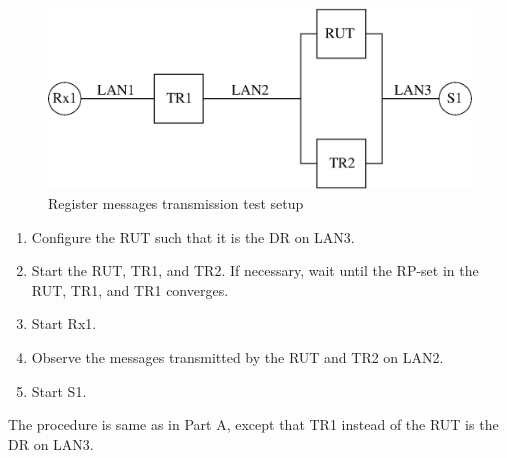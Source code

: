 \documentclass[11pt]{report}
\begin{document}
\begin{figure}[htbp]
  \begin{center}
    \includegraphics[scale=0.8]{figs/pim_test_3_1_register_messages_transmission}
    \caption{Register messages transmission test setup}
    \label{fig:pim_test_3_1_register_messages_transmission}
  \end{center}
\end{figure}



\begin{enumerate}

  \item Configure the RUT such that it is the DR on LAN3.

  \item Start the RUT, TR1, and TR2. If necessary, wait until the RP-set in
        the RUT, TR1, and TR1 converges.

  \item Start Rx1.

  \item Observe the messages transmitted by the RUT and TR2 on LAN2.

  \item Start S1.

\end{enumerate}


The procedure is same as in Part A, except that TR1 instead of the RUT is the
DR on LAN3.

\end{document}
